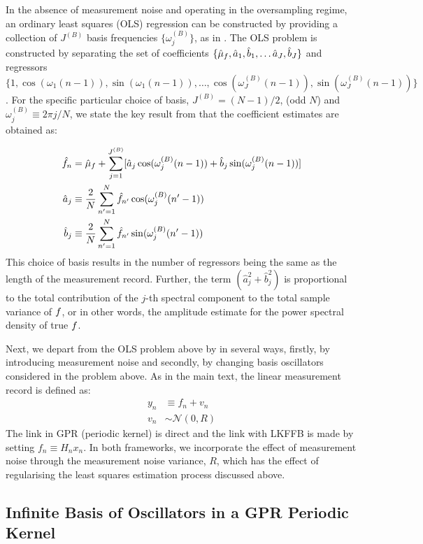 In the absence of measurement noise and operating in the oversampling regime, an ordinary least squares (OLS) regression can be constructed by providing a collection of $J^{(B)}$ basis frequencies $\{\omega_j^{(B)}\}$, as in \cite{hamilton1994time}. The OLS problem is constructed by separating the set of coefficients $\{\hat{\mu}_f, \hat{a}_1, \hat{b}_1, \hdots \hat{a}_J, \hat{b}_J\}$ and regressors $\{1,\cos(\omega_1 (n-1)), \sin(\omega_1 (n-1)), \hdots, \cos(\omega_J^{(B)} (n-1)), \sin(\omega_J^{(B)} (n-1)) \}$. For the specific particular choice of basis,  $J^{(B)} = (N-1)/2$, (odd $N$) and $\omega_j^{(B)} \equiv 2\pi j / N$, we state the key result from \cite{hamilton1994time} that the coefficient estimates are obtained as:

\begin{align}
\hat{f}_n &= \hat{\mu}_f  + \sum_{j=1}^{J^{(B)}}  [\hat{a}_j \cos(\omega_j^{(B)} (n-1)) +  \hat{b}_j \sin(\omega_j^{(B)} (n-1)) ] \\
\hat{a}_j &\equiv \frac{2}{N} \sum_{n'=1}^{N} \hat{f}_{n'} \cos(\omega_j^{(B)}(n'-1)) \\
\hat{b}_j &\equiv \frac{2}{N} \sum_{n'=1}^{N} \hat{f}_{n'} \sin(\omega_j^{(B)}(n'-1))
\end{align}
This choice of basis results in the number of regressors being the same as the length of the measurement record. Further, the term $(\hat{a}_j^2 + \hat{b}_j^2)$ is proportional to the total contribution of the $j$-th spectral component to the total sample variance of $f$, or in other words, the amplitude estimate for the power spectral density of true $f$.

Next, we depart from the OLS problem above by in several ways, firstly, by introducing measurement noise and secondly, by changing basis oscillators considered in the problem above. As in the main text, the linear measurement record is defined as:
\begin{align}
y_n &\equiv  f_n + v_n \\
v_n & \sim \mathcal{N}(0, R)
\end{align}
The link in GPR (periodic kernel) is direct and the link with LKFFB is made by setting $f_n \equiv H_nx_n$. In both frameworks, we incorporate the effect of measurement noise through the measurement noise variance, $R$, which has the effect of regularising the least squares estimation process discussed above.

\subsection{Infinite Basis of Oscillators in a GPR Periodic Kernel}\label{sec:ap_approxSP:GPRPKernel}


